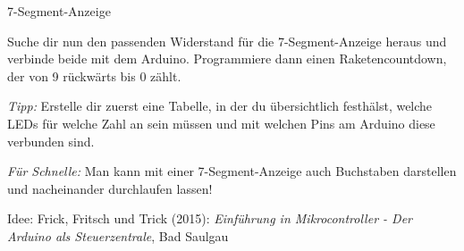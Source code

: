 \begin{zsfg}{7-Segment-Anzeige}
\begin{minipage}{0.4\textwidth}
\begin{minipage}{0.48\textwidth}
		\end{minipage}
		\hfill
		\begin{minipage}{0.48\textwidth}
			\vspace{-0.2\baselineskip}
			
			\vspace{-1.5\baselineskip}
		\end{minipage}
		\hfill
	\end{minipage}
\end{zsfg}

\begin{projekt}[Raketencountdown]\label{proj:raketencountdown}
	Suche dir nun den passenden Widerstand für die 7-Segment-Anzeige heraus und verbinde beide mit dem Arduino. Programmiere dann einen Raketencountdown, der von 9 rückwärts bis 0 zählt.
	
	\emph{Tipp:} Erstelle dir zuerst eine Tabelle, in der du übersichtlich festhälst, welche LEDs für welche Zahl an sein müssen und mit welchen Pins am Arduino diese verbunden sind.
	
	\emph{Für Schnelle:} Man kann mit einer 7-Segment-Anzeige auch Buchstaben darstellen und nacheinander durchlaufen lassen!
	
	{\scriptsize Idee: Frick, Fritsch und Trick (2015): \emph{Einführung in Mikrocontroller - Der Arduino als Steuerzentrale}, Bad Saulgau}
\end{projekt}

%	


